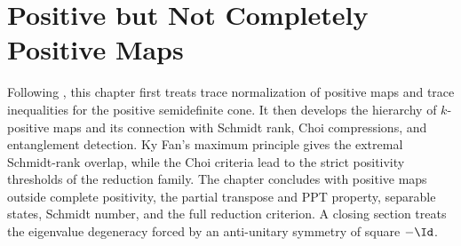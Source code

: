 \chapter{Positive but Not Completely Positive Maps}\label{ch:positive_not_cp}

Following \cite[Chapter~3]{Wolf2012Quantum}, this chapter first treats trace
normalization of positive maps and trace inequalities for the positive
semidefinite cone. It then develops the hierarchy of $k$-positive maps and its
connection with Schmidt rank, Choi compressions, and entanglement detection.
Ky Fan's maximum principle gives the extremal Schmidt-rank overlap, while the
Choi criteria lead to the strict positivity thresholds of the reduction
family. The chapter concludes with positive maps outside complete positivity,
the partial transpose and PPT property, separable states, Schmidt number, and
the full reduction criterion. A closing section treats the eigenvalue degeneracy
forced by an anti-unitary symmetry of square $-\Id$.








